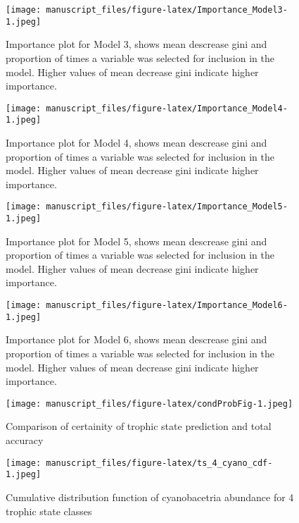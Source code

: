 \documentclass[11pt,]{article}
\begin{document}
\begin{figure}[htbp]
\centering
\texttt{[image: manuscript\_files/figure-latex/Importance\_Model3-1.jpeg]}
\caption{Importance plot for Model 3, shows mean descrease gini and
proportion of times a variable was selected for inclusion in the model.
Higher values of mean decrease gini indicate higher importance.
\label{fig:Importance_Model3}}
\end{figure}

\newpage

\begin{figure}[htbp]
\centering
\texttt{[image: manuscript\_files/figure-latex/Importance\_Model4-1.jpeg]}
\caption{Importance plot for Model 4, shows mean descrease gini and
proportion of times a variable was selected for inclusion in the model.
Higher values of mean decrease gini indicate higher importance.
\label{fig:Importance_Model4}}
\end{figure}

\newpage

\begin{figure}[htbp]
\centering
\texttt{[image: manuscript\_files/figure-latex/Importance\_Model5-1.jpeg]}
\caption{Importance plot for Model 5, shows mean descrease gini and
proportion of times a variable was selected for inclusion in the model.
Higher values of mean decrease gini indicate higher importance.
\label{fig:Importance_Model5}}
\end{figure}

\newpage

\begin{figure}[htbp]
\centering
\texttt{[image: manuscript\_files/figure-latex/Importance\_Model6-1.jpeg]}
\caption{Importance plot for Model 6, shows mean descrease gini and
proportion of times a variable was selected for inclusion in the model.
Higher values of mean decrease gini indicate higher importance.
\label{fig:Importance_Model6}}
\end{figure}

\newpage

\begin{figure}[htbp]
\centering
\texttt{[image: manuscript\_files/figure-latex/condProbFig-1.jpeg]}
\caption{Comparison of certainity of trophic state prediction and total
accuracy\label{fig:condProbFig}}
\end{figure}

\newpage

\begin{figure}[htbp]
\centering
\texttt{[image: manuscript\_files/figure-latex/ts\_4\_cyano\_cdf-1.jpeg]}
\caption{Cumulative distribution function of cyanobacetria abundance for
4 trophic state classes\label{fig:ts_4_cyano_cdf}}
\end{figure}
\end{document}
